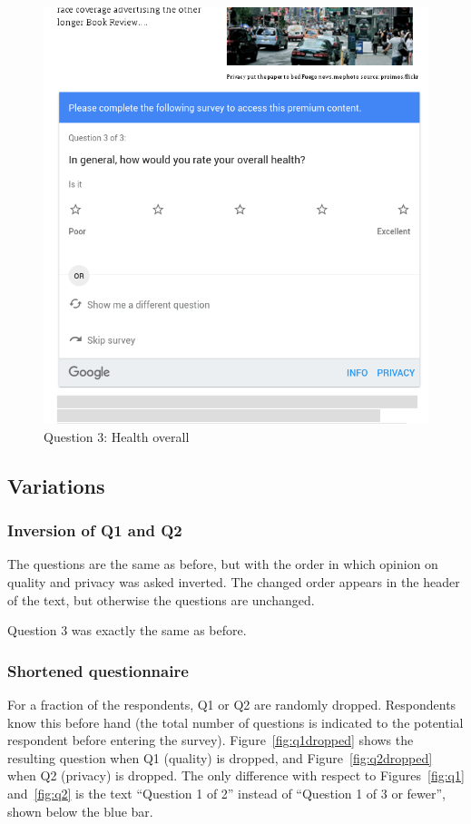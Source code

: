 \begin{figure}
	\includegraphics[width=\textwidth]{Selection_353.png}
	\caption{\label{fig:q3}Question 3: Health overall}
\end{figure}

\subsection{Variations}
\subsubsection{Inversion of Q1 and Q2}
The questions are the same as before, but with the order in which opinion on quality and privacy was asked inverted. The changed order appears in the header of the text, but otherwise the questions are unchanged. 


Question 3 was exactly the same as before.

\subsubsection{Shortened questionnaire}
For a fraction of the respondents, Q1 or Q2 are randomly dropped. Respondents know this before hand (the total number of questions is indicated to the potential respondent before entering the survey). Figure~\ref{fig:q1dropped} shows the resulting question when Q1 (quality) is dropped, and Figure~\ref{fig:q2dropped} when Q2 (privacy) is dropped. The only difference with respect to Figures~\ref{fig:q1} and~\ref{fig:q2} is the text ``Question 1 of 2'' instead of ``Question 1 of 3 or fewer'', shown below the blue bar.

